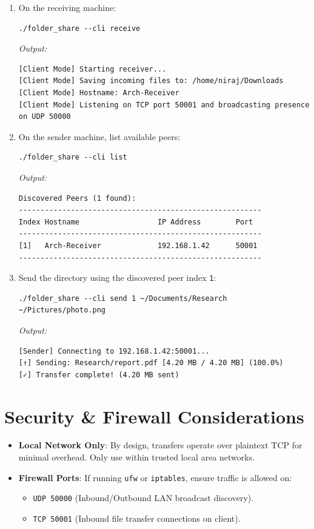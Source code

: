 \documentclass[11pt,a4paper]{article}
\begin{document}
\begin{enumerate}
    \item On the receiving machine:
    \begin{lstlisting}[style=bashblock]
./folder_share --cli receive
    \end{lstlisting}
    \textit{Output:}
    \begin{lstlisting}[style=bashblock]
[Client Mode] Starting receiver...
[Client Mode] Saving incoming files to: /home/niraj/Downloads
[Client Mode] Hostname: Arch-Receiver
[Client Mode] Listening on TCP port 50001 and broadcasting presence on UDP 50000
    \end{lstlisting}

    \item On the sender machine, list available peers:
    \begin{lstlisting}[style=bashblock]
./folder_share --cli list
    \end{lstlisting}
    \textit{Output:}
    \begin{lstlisting}[style=bashblock]
Discovered Peers (1 found):
--------------------------------------------------------
Index Hostname                  IP Address        Port    
--------------------------------------------------------
[1]   Arch-Receiver             192.168.1.42      50001   
--------------------------------------------------------
    \end{lstlisting}

    \item Send the directory using the discovered peer index \texttt{1}:
    \begin{lstlisting}[style=bashblock]
./folder_share --cli send 1 ~/Documents/Research ~/Pictures/photo.png
    \end{lstlisting}
    \textit{Output:}
    \begin{lstlisting}[style=bashblock]
[Sender] Connecting to 192.168.1.42:50001...
[↑] Sending: Research/report.pdf [4.20 MB / 4.20 MB] (100.0%)
[✓] Transfer complete! (4.20 MB sent)
    \end{lstlisting}
\end{enumerate}

\section{Security \& Firewall Considerations}
\begin{itemize}
    \item \textbf{Local Network Only}: By design, transfers operate over plaintext TCP for minimal overhead. Only use within trusted local area networks.
    \item \textbf{Firewall Ports}: If running \texttt{ufw} or \texttt{iptables}, ensure traffic is allowed on:
    \begin{itemize}
        \item \texttt{UDP 50000} (Inbound/Outbound LAN broadcast discovery).
        \item \texttt{TCP 50001} (Inbound file transfer connections on client).
    \end{itemize}
\end{itemize}
\end{document}
